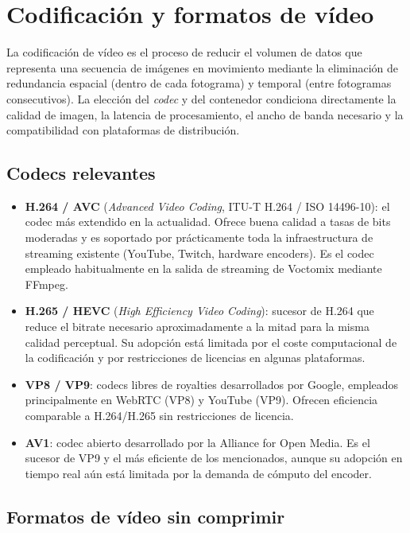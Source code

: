\section{Codificación y formatos de vídeo}

La codificación de vídeo es el proceso de reducir el volumen de datos que representa
una secuencia de imágenes en movimiento mediante la eliminación de redundancia espacial
(dentro de cada fotograma) y temporal (entre fotogramas consecutivos). La elección del
\textit{codec} y del contenedor condiciona directamente la calidad de imagen, la
latencia de procesamiento, el ancho de banda necesario y la compatibilidad con
plataformas de distribución.

\subsection{Codecs relevantes}

\begin{itemize}
  \item \textbf{H.264 / AVC} (\textit{Advanced Video Coding}, ITU-T H.264 / ISO 14496-10):
  el codec más extendido en la actualidad. Ofrece buena calidad a tasas de bits moderadas
  y es soportado por prácticamente toda la infraestructura de streaming existente
  (YouTube, Twitch, hardware encoders). Es el codec empleado habitualmente en la
  salida de streaming de Voctomix mediante FFmpeg.
  \item \textbf{H.265 / HEVC} (\textit{High Efficiency Video Coding}): sucesor de H.264
  que reduce el bitrate necesario aproximadamente a la mitad para la misma calidad
  perceptual. Su adopción está limitada por el coste computacional de la codificación
  y por restricciones de licencias en algunas plataformas.
  \item \textbf{VP8 / VP9}: codecs libres de royalties desarrollados por Google, empleados
  principalmente en WebRTC (VP8) y YouTube (VP9). Ofrecen eficiencia comparable a H.264/H.265
  sin restricciones de licencia.
  \item \textbf{AV1}: codec abierto desarrollado por la Alliance for Open Media. Es el
  sucesor de VP9 y el más eficiente de los mencionados, aunque su adopción en tiempo
  real aún está limitada por la demanda de cómputo del encoder.
\end{itemize}

\subsection{Formatos de vídeo sin comprimir}

